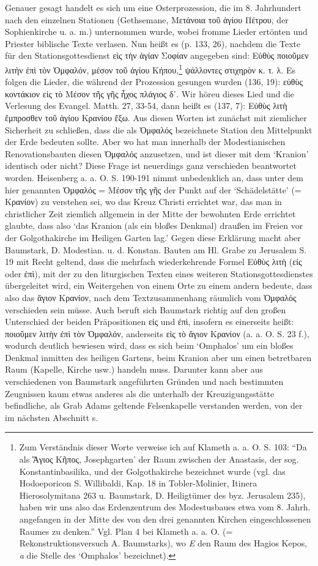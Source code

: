 \documentclass[a4paper, 11pt, oneside]{article}
\begin{document}
Genauer gesagt handelt es sich um eine Osterprozession, die im 8. Jahrhundert nach den einzelnen Stationen (Gethsemane, Μετάνοια τοῦ ἁγίου Πέτρου, der Sophienkirche u. a. m.) unternommen wurde, wobei fromme Lieder ertönten und Priester biblische Texte verlasen. Nun heißt es (p. 133, 26), nachdem die Texte für den Stationsgottesdienst εἰς τὴν ἁγίαν Σοφίαν angegeben sind: Εὐθὺς ποιοῦμεν λιτὴν ἐπὶ τὸν Ὀμφαλόν, μέσον τοῦ ἁγίου Κήπου,\footnote{Zum Verständnis dieser Worte verweise ich auf Klameth a. a. O. S. 103: "`Da als Ἅγιος Κῆπος, Josephgarten' der Raum zwischen der Anastasis, der sog. Konstantinbasilika, und der Golgothakirche bezeichnet wurde (vgl. das Hodoeporicon S. Willibaldi, Kap. 18 in Tobler-Molinier, Itinera Hierosolymitana 263 u. Baumstark, D. Heiligtümer des byz. Jerusalem 235), haben wir uns also das Erdenzentrum des Modestusbaues etwa vom 8. Jahrh. angefangen in der Mitte des von den drei genannten Kirchen eingeschlossenen Raumes zu denken."' Vgl. Plan 4 bei Klameth a. a. O. (= Rekonstruktionsversuch A. Baumstarks), wo \emph{E} den Raum des Hagios Kepos, \emph{a} die Stelle des `Omphalos' bezeichnet).} ψάλλοντες στιχηρὸν κ. τ. λ. Es folgen die Lieder, die während der Prozession gesungen wurden (136, 19): εὐθὺς κοντάκιον εἰς τὸ Μέσον τῆς γῆς ἦχος πλάγιος δʹ. Wir höreu dieses Lied und die Verlesung des Evangel. Matth. 27, 33-54, dann heißt es (137, 7): Εὐθὺς λιτὴ ἔμπροσθεν τοῦ ἁγίου Κρανίου ἔξω. Aus diesen Worten ist zunächst mit ziemlicher Sicherheit zu schließen, dass die als Ὀμφαλός bezeichnete Station den Mittelpunkt der Erde bedeuten sollte. Aber wo hat man innerhalb der Modestianischen Renovationsbauten diesen Ὀμφαλός anzusetzen, und ist dieser mit dem `Kranion' identisch oder nicht? Diese Frage ist neuerdings ganz verschieden beantwortet worden. Heisenberg a. a. O. S. 190-191 nimmt unbedenklich an, dass unter dem hier genannten Ὀμφαλός = Μέσον τῆς γῆς der Punkt auf der `Schädelstätte' (= Κρανίον) zu verstehen sei, wo das Kreuz Christi errichtet war, das man in christlicher Zeit ziemlich allgemein in der Mitte der bewohnten Erde errichtet glaubte, dass also `das Kranion (als ein bloßes Denkmal) draußen im Freien vor der Golgothakirche im Heiligen Garten lag.' Gegen diese Erklärung macht aber Baumstark, D. Modestian. u. d. Konstan. Bauten am Hl. Grabe zu Jerusalem S. 19 mit Recht geltend, dass die mehrfach wiederkehrende Formel Εὐθὺς λιτὴ (εἰς oder ἐπὶ), mit der zu den liturgischen Texten eines weiteren Stationsgottesdienstes übergeleitet wird, ein Weitergehen von einem Orte zu einem andern bedeute, dass also das ἅγιον Κρανίον, nach dem Textzusammenhang räumlich vom Ὀμφαλός verschieden sein müsse. Auch beruft sich Baumstark richtig auf den großen Unterschied der beiden Präpositionen εἰς und ἐπὶ, insofern es einerseits heißt: ποιοῦμεν λιτὴν ἐπὶ τὸν Ὀμφαλόν, anderseits εἰς τὸ ἅγιον Κρανίον (a. a. O. S. 23 f.), wodurch deutlich bewiesen wird, dass es sich beim `Omphalos' um ein bloßes Denkmal inmitten des heiligen Gartens, beim Kranion aber um einen betretbaren Raum (Kapelle, Kirche usw.) handeln muss. Darunter kann aber aus verschiedenen von Baumstark angeführten Gründen und nach bestimmten Zeugnissen kaum etwas anderes als die unterhalb der Kreuzigungsstätte befindliche, als Grab Adams geltende Felsenkapelle verstanden werden, von der im nächsten Abschnitt s. 
\end{document}
